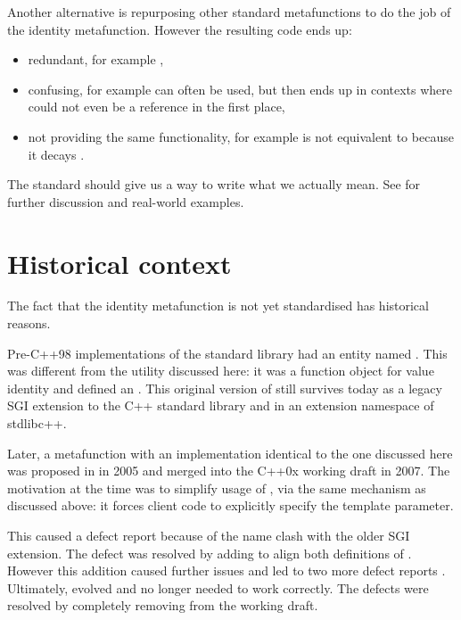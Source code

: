 Another alternative is repurposing other standard metafunctions to do the job of the identity metafunction. However the resulting code ends up:
\begin{itemize}
\item redundant, for example ,
\item confusing, for example  can often be used, but then ends up in contexts where  could not even be a reference in the first place,
\item not providing the same functionality, for example  is not equivalent to  because it decays .
 \end{itemize}
 The standard should give us a way to write what we actually mean. See \cite{N3766} for further discussion and real-world examples.


\section{Historical context}
The fact that the identity metafunction is not yet standardised has historical reasons.

Pre-C++98 implementations of the standard library had an entity named . This was different from the utility discussed here: it was a function object for value identity and defined an . This original version of  still survives today as a legacy SGI extension to the C++ standard library and in an extension namespace of stdlibc++.

Later, a metafunction  with an implementation identical to the one discussed here was proposed in \cite{N1856} in 2005 and merged into the C++0x working draft \cite{N2284} in 2007. The motivation at the time was to simplify usage of , via the same mechanism as discussed above: it forces client code to explicitly specify the template parameter.

This caused a defect report \cite{700} because of the name clash with the older SGI extension. The defect was resolved by adding  to align both definitions of . However this addition caused further issues and led to two more defect reports \cite{823}\cite{939}. Ultimately,  evolved and no longer needed  to work correctly. The defects were resolved by completely removing  from the working draft.


